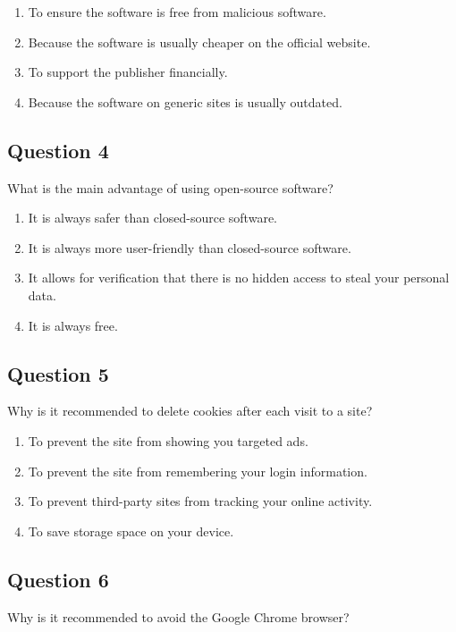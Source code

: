 \documentclass[12pt,a4paper]{article}
\begin{document}
\begin{enumerate}[label=\Alph*., leftmargin=*]
\item To ensure the software is free from malicious software.
\item Because the software is usually cheaper on the official website.
\item To support the publisher financially.
\item Because the software on generic sites is usually outdated.
\end{enumerate}

\bigskip


\subsection*{Question 4}
What is the main advantage of using open-source software?

\begin{enumerate}[label=\Alph*., leftmargin=*]
\item It is always safer than closed-source software.
\item It is always more user-friendly than closed-source software.
\item It allows for verification that there is no hidden access to steal your personal data.
\item It is always free.
\end{enumerate}

\bigskip


\subsection*{Question 5}
Why is it recommended to delete cookies after each visit to a site?

\begin{enumerate}[label=\Alph*., leftmargin=*]
\item To prevent the site from showing you targeted ads.
\item To prevent the site from remembering your login information.
\item To prevent third-party sites from tracking your online activity.
\item To save storage space on your device.
\end{enumerate}

\bigskip


\subsection*{Question 6}
Why is it recommended to avoid the Google Chrome browser?
\end{document}
